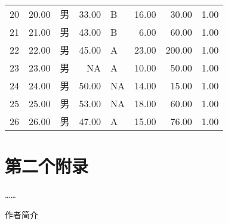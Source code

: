 \documentclass[unicode,master,printedition]{seuthesis} %
\begin{document}
\begin{Appendix}
\begin{table}[ht]
\begin{center}
\begin{tabular}{rrlrlrrr}
  20 & 20.00 & 男 & 33.00 & B & 16.00 & 30.00 & 1.00 \\ 
  21 & 21.00 & 男 & 43.00 & B & 6.00 & 60.00 & 1.00 \\ 
  22 & 22.00 & 男 & 45.00 & A & 23.00 & 200.00 & 1.00 \\ 
  23 & 23.00 & 男 & NA & A & 10.00 & 50.00 & 1.00 \\ 
  24 & 24.00 & 男 & 50.00 & NA & 14.00 & 15.00 & 1.00 \\ 
  25 & 25.00 & 男 & 53.00 & NA & 18.00 & 60.00 & 1.00 \\ 
  26 & 26.00 & 男 & 47.00 & A & 15.00 & 76.00 & 1.00 \\ 
   \hline
\end{tabular}
\label{basic_table}
\end{center}
\end{table}

  \chapter{第二个附录}
  ……
\end{Appendix}

\newpage
\printindex %

\begin{Resume}
作者简介
\end{Resume}
\backcover
\end{document}
